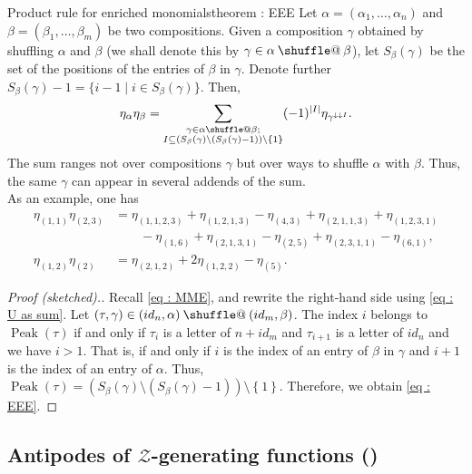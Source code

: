 \documentclass[numbers=enddot,12pt,final,onecolumn,notitlepage]{scrartcl}%
\makeatletter
\newcommand{\al}{\alpha}
\newcommand{\be}{\beta}
\newcommand{\Peak}{\operatorname{Peak}}
\providecommand*{\shuffle}{%
  \mathbin{\mathpalette\shuffle@{}}%
}
\newcommand*{\shuffle@}[2]{%
  \sbox0{$#1\vcenter{}$}%
  \kern .15\ht0 %
  \rlap{\vrule height .25\ht0 depth 0pt width 2.5\ht0}%
  \raise.1\ht0\hbox to 2.5\ht0{%
    \vrule height 1.75\ht0 depth -.1\ht0 width .17\ht0 %
    \hfill
    \vrule height 1.75\ht0 depth -.1\ht0 width .17\ht0 %
    \hfill
    \vrule height 1.75\ht0 depth -.1\ht0 width .17\ht0 %
  }%
  \kern .15\ht0 %
}
\newcommand{\calZ}{\mathcal{Z}}
\newcommand{\0}{\phantom{c}}
\let\sumnonlimits\sum
\renewcommand{\sum}{\sumnonlimits\limits}
\makeatother
\begin{document}
%
\begin{theorem}{Product rule for enriched monomials}{theorem : EEE}
Let $\al=(\al_1,\dots,\al_n)$ and $\beta=(\be_1,\dots,\be_m)$ be two compositions. Given a composition $\gamma$ obtained by shuffling $\al$ and $\be$ (we shall denote this by $\gamma \in \al\shuffle\be$), let $S_\beta(\gamma)$ be the set of the positions of the entries of $\beta$ in $\gamma$. Denote further $S_\beta(\gamma)-1 =\{i-1 \mid i \in S_\beta(\gamma)\}$. Then,
\begin{equation}
\label{eq : EEE}
\eta_\al \eta_\beta
= \sum_{\substack{\gamma \in \al \shuffle \be ;\\
                   I\subseteq \left(S_{\be}(\gamma)\setminus (S_{\be}(\gamma)-1)\right) \setminus \left\{1\right\}}}
(-1)^{|I|}\eta_{\gamma^{\downarrow\downarrow I}} .
\end{equation}
The sum ranges not over compositions $\gamma$ but over ways to shuffle $\al$ with $\be$. Thus, the same $\gamma$ can appear in several addends of the sum.\\
As an example, one has
\begin{align*}
\eta_{(1,1)}\eta_{(2,3)} &= \eta_{(1, 1, 2, 3)} + \eta_{(1, 2, 1, 3)} -\eta_{(4, 3)} + \eta_{(2,1,1,3)}+\eta_{(1,2,3,1)}\\
&\qquad -\eta_{(1,6)}+\eta_{(2,1,3,1)}-\eta_{(2,5)}+\eta_{(2,3,1,1)}-\eta_{(6,1)},\\
\eta_{(1,2)}\eta_{(2)} &=  \eta_{(2,1,2)} +   2\eta_{(1,2,2)} - \eta_{(5)}.
\end{align*}
\end{theorem}
\begin{proof}[Proof (sketched).]
Recall \eqref{eq : MME}, and rewrite the right-hand side using \eqref{eq : U as sum}.
Let $(\tau,\gamma) \in (id_n,\al)\shuffle(id_m,\be)$. The index $i$ belongs to $\Peak(\tau)$ if and only if $\tau_i$ is a letter of $n+id_m$ and $\tau_{i+1}$ is a letter of $id_n$ and we have $i > 1$. That is, if and only if $i$ is the index of an entry of $\beta$ in $\gamma$ and $i+1$ is the index of an entry of $\al$.
Thus, $\Peak(\tau) = \left(S_{\be}(\gamma)\setminus (S_{\be}(\gamma)-1)\right) \setminus \left\{1\right\}$.
Therefore, we obtain \eqref{eq : EEE}.
\end{proof}

\subsection{Antipodes of $\calZ$-generating functions ({\color{red}{NEW!}})}
\end{document}
